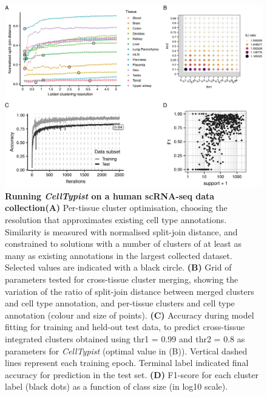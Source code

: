 \begin{figure}[hb!]
    \centering    
    \includegraphics[width=1.0\textwidth]{Chapter3/Figs/chap4_figHA.png} %
    \caption[Running \textit{CellTypist} on a human scRNA-seq data collection]{\textbf{Running \textit{CellTypist} on a human scRNA-seq data collection}\newline\textbf{(A)} Per-tissue cluster optimisation, choosing the resolution that approximates existing cell type annotations. Similarity is measured with normalised split-join distance, and constrained to solutions with a number of clusters of at least as many as existing annotations in the largest collected dataset. Selected values are indicated with a black circle. \textbf{(B)} Grid of parameters tested for cross-tissue cluster merging, showing the variation of the ratio of split-join distance between merged clusters and cell type annotation, and per-tissue clusters and cell type annotation (colour and size of points). \textbf{(C)} Accuracy during model fitting for training and held-out test data, to predict cross-tissue integrated clusters obtained using thr1 = 0.99 and thr2 = 0.8 as parameters for \textit{CellTypist} (optimal value in (B)). Vertical dashed lines represent each training epoch. Terminal label indicated final accuracy for prediction in the test set. \textbf{(D)} F1-score for each cluster label (black dots) as a function of class size (in log10 scale).}
    \label{fig:chap3_HA}
\end{figure}

